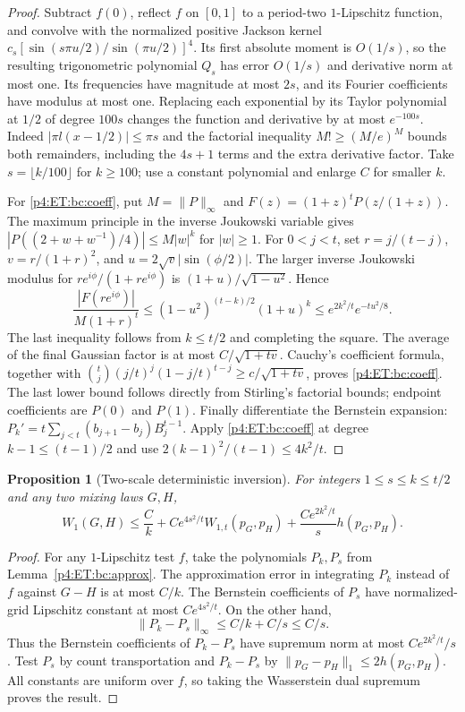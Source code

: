 \documentclass[11pt,a4paper]{article}
\newtheorem{proposition}[theorem]{Proposition}
\theoremstyle{definition}
\theoremstyle{remark}
\numberwithin{equation}{section}
\begin{document}
\begin{proof}
Subtract $f(0)$, reflect $f$ on $[0,1]$ to a period-two $1$-Lipschitz
function, and convolve with the normalized positive Jackson kernel
$c_s[\sin(s\pi u/2)/\sin(\pi u/2)]^4$. Its first absolute moment is
$O(1/s)$, so the resulting trigonometric polynomial $Q_s$ has error
$O(1/s)$ and derivative norm at most one. Its frequencies have magnitude
at most $2s$, and its Fourier coefficients have modulus at most one.
Replacing each exponential by its Taylor polynomial at $1/2$ of degree
$100s$ changes the function and derivative by at most $e^{-100s}$.
Indeed $|\pi l(x-1/2)|\le\pi s$ and the factorial inequality
$M!\ge(M/e)^M$ bounds both remainders, including the $4s+1$ terms and the
extra derivative factor. Take $s=\lfloor k/100\rfloor$ for $k\ge100$;
use a constant polynomial and enlarge $C$ for smaller $k$.

For \eqref{p4:ET:bc:coeff}, put $M=\|P\|_\infty$ and
$F(z)=(1+z)^tP(z/(1+z))$. The maximum principle in the inverse Joukowski
variable gives
$|P((2+w+w^{-1})/4)|\le M|w|^k$ for $|w|\ge1$.
For $0<j<t$, set $r=j/(t-j)$, $v=r/(1+r)^2$, and
$u=2\sqrt v|\sin(\phi/2)|$. The larger inverse Joukowski modulus for
$re^{i\phi}/(1+re^{i\phi})$ is $(1+u)/\sqrt{1-u^2}$. Hence
\[
 \frac{|F(re^{i\phi})|}{M(1+r)^t}
 \le(1-u^2)^{(t-k)/2}(1+u)^k
 \le e^{2k^2/t}e^{-tu^2/8}.
\]
The last inequality follows from $k\le t/2$ and completing the square.
The average of the final Gaussian factor is at most
$C/\sqrt{1+tv}$. Cauchy's coefficient formula, together with
$\binom tj(j/t)^j(1-j/t)^{t-j}\ge c/\sqrt{1+tv}$, proves
\eqref{p4:ET:bc:coeff}. The last lower bound follows directly from Stirling's
factorial bounds; endpoint coefficients are $P(0)$ and $P(1)$.
Finally differentiate the Bernstein expansion:
$P_k'=t\sum_{j<t}(b_{j+1}-b_j)B_j^{t-1}$.
Apply \eqref{p4:ET:bc:coeff} at degree $k-1\le(t-1)/2$ and use
$2(k-1)^2/(t-1)\le4k^2/t$.
\end{proof}

\begin{proposition}[Two-scale deterministic inversion]
\label{p4:ET:bc:twoscale}
For integers $1\le s\le k\le t/2$ and any two mixing laws $G,H$,
\begin{equation}\label{p4:ET:bc:twoscaleineq}
 W_1(G,H)\le \frac Ck
       +Ce^{4s^2/t}W_{1,t}(p_G,p_H)
       +\frac{Ce^{2k^2/t}}s h(p_G,p_H).
\end{equation}
\end{proposition}
\begin{proof}
For any $1$-Lipschitz test $f$, take the polynomials $P_k,P_s$ from
Lemma~\ref{p4:ET:bc:approx}. The approximation error in integrating $P_k$
instead of $f$ against $G-H$ is at most $C/k$. The Bernstein coefficients
of $P_s$ have normalized-grid Lipschitz constant at most $Ce^{4s^2/t}$.
On the other hand,
\[
 \|P_k-P_s\|_\infty\le C/k+C/s\le C/s.
\]
Thus the Bernstein coefficients of $P_k-P_s$ have supremum norm at most
$Ce^{2k^2/t}/s$. Test $P_s$ by count transportation and $P_k-P_s$ by
$\|p_G-p_H\|_1\le2h(p_G,p_H)$. All constants are uniform over $f$,
so taking the Wasserstein dual supremum proves the result.
\end{proof}
\end{document}
